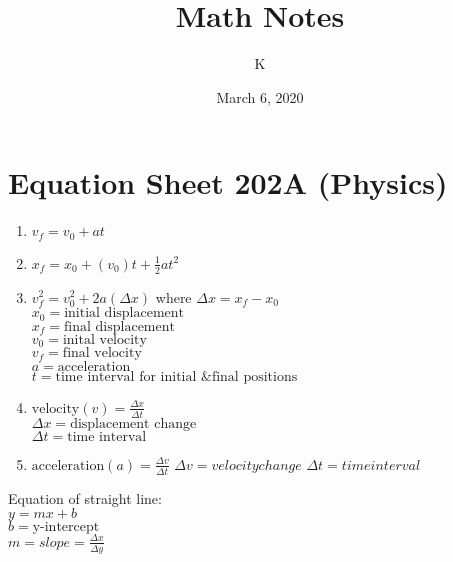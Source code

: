 \documentclass[12pt, letterpaper]{article}
\title{Math Notes}
\author{K}
\date{March 6, 2020}
\begin{document}
\section{Equation Sheet 202A (Physics)}
\begin{enumerate}
  \item $v_f = v_0 + at$
  \item $x_f = x_0 + (v_0)t + \frac{1}{2} a t^2$
  \item $v_f^2 = v_0^2 + 2a (\Delta x)$
        where $\Delta x = x_f - x_0$\\
        $x_0 = \text{initial displacement}$\\
        $x_f = \text{final displacement}$\\
        $v_0 = \text{inital velocity}$\\
        $v_f = \text{final velocity}$\\
        $a = \text{acceleration}$\\
        $t = \text{time interval for initial \& final positions}$
  \item $\text{velocity} (v) = \frac{\Delta x}{\Delta t}$\\
        $\Delta x = \text{displacement change}$\\
        $\Delta t = \text{time interval}$
  \item $\text{acceleration} (a) = \frac{\Delta v}{\Delta t}$
        $\Delta v = velocity change$
        $\Delta t = time interval$
\end{enumerate}

Equation of straight line:\\
$y=mx+b$\\
$b = \text{y-intercept}$\\
$m = slope = \frac{\Delta x}{\Delta y}$
\end{document}
